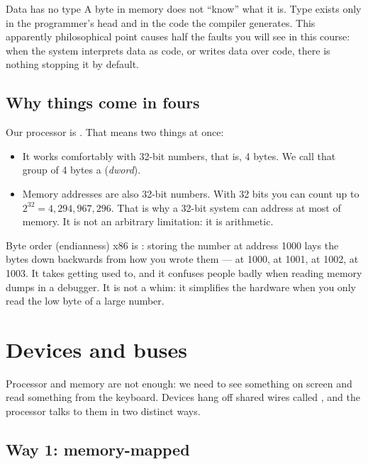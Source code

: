 \begin{concept}{Data has no type}
A byte in memory does not ``know'' what it is. Type exists only in the programmer's head and in
the code the compiler generates. This apparently philosophical point causes half the faults you
will see in this course: when the system interprets data as code, or writes data over code, there
is nothing stopping it by default.
\end{concept}

\subsection{Why things come in fours}

Our processor is . That means two things at once:

\begin{itemize}
  \item It works comfortably with 32-bit numbers, that is, 4 bytes. We call that group of 4 bytes
        a  (\emph{dword}).
  \item Memory addresses are also 32-bit numbers. With 32 bits you can count up to
        $2^{32} = 4{,}294{,}967{,}296$. That is why a 32-bit system can address at most
         of memory. It is not an arbitrary limitation: it is arithmetic.
\end{itemize}

\begin{warn}{Byte order (endianness)}
x86 is : storing the number  at address 1000 lays the bytes
down backwards from how you wrote them ---  at 1000,  at 1001,  at
1002,  at 1003. It takes getting used to, and it confuses people badly when reading
memory dumps in a debugger. It is not a whim: it simplifies the hardware when you only read the
low byte of a large number.
\end{warn}

\section{Devices and buses}

Processor and memory are not enough: we need to see something on screen and read something from
the keyboard. Devices hang off shared wires called , and the processor talks to them
in two distinct ways.

\subsection{Way 1: memory-mapped}

